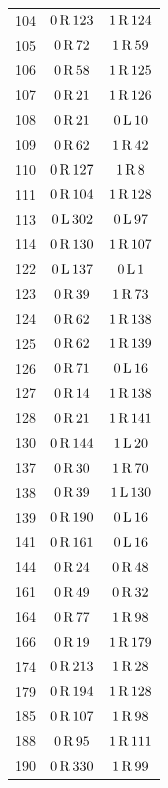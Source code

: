 \begin{longtable}{@{}rcc@{}}
104 & $0\,\mathrm{R}\,123$ & $1\,\mathrm{R}\,124$\\
105 & $0\,\mathrm{R}\,72$ & $1\,\mathrm{R}\,59$\\
106 & $0\,\mathrm{R}\,58$ & $1\,\mathrm{R}\,125$\\
107 & $0\,\mathrm{R}\,21$ & $1\,\mathrm{R}\,126$\\
108 & $0\,\mathrm{R}\,21$ & $0\,\mathrm{L}\,10$\\
109 & $0\,\mathrm{R}\,62$ & $1\,\mathrm{R}\,42$\\
110 & $0\,\mathrm{R}\,127$ & $1\,\mathrm{R}\,8$\\
111 & $0\,\mathrm{R}\,104$ & $1\,\mathrm{R}\,128$\\
113 & $0\,\mathrm{L}\,302$ & $0\,\mathrm{L}\,97$\\
114 & $0\,\mathrm{R}\,130$ & $1\,\mathrm{R}\,107$\\
122 & $0\,\mathrm{L}\,137$ & $0\,\mathrm{L}\,1$\\
123 & $0\,\mathrm{R}\,39$ & $1\,\mathrm{R}\,73$\\
124 & $0\,\mathrm{R}\,62$ & $1\,\mathrm{R}\,138$\\
125 & $0\,\mathrm{R}\,62$ & $1\,\mathrm{R}\,139$\\
126 & $0\,\mathrm{R}\,71$ & $0\,\mathrm{L}\,16$\\
127 & $0\,\mathrm{R}\,14$ & $1\,\mathrm{R}\,138$\\
128 & $0\,\mathrm{R}\,21$ & $1\,\mathrm{R}\,141$\\
130 & $0\,\mathrm{R}\,144$ & $1\,\mathrm{L}\,20$\\
137 & $0\,\mathrm{R}\,30$ & $1\,\mathrm{R}\,70$\\
138 & $0\,\mathrm{R}\,39$ & $1\,\mathrm{L}\,130$\\
139 & $0\,\mathrm{R}\,190$ & $0\,\mathrm{L}\,16$\\
141 & $0\,\mathrm{R}\,161$ & $0\,\mathrm{L}\,16$\\
144 & $0\,\mathrm{R}\,24$ & $0\,\mathrm{R}\,48$\\
161 & $0\,\mathrm{R}\,49$ & $0\,\mathrm{R}\,32$\\
164 & $0\,\mathrm{R}\,77$ & $1\,\mathrm{R}\,98$\\
166 & $0\,\mathrm{R}\,19$ & $1\,\mathrm{R}\,179$\\
174 & $0\,\mathrm{R}\,213$ & $1\,\mathrm{R}\,28$\\
179 & $0\,\mathrm{R}\,194$ & $1\,\mathrm{R}\,128$\\
185 & $0\,\mathrm{R}\,107$ & $1\,\mathrm{R}\,98$\\
188 & $0\,\mathrm{R}\,95$ & $1\,\mathrm{R}\,111$\\
190 & $0\,\mathrm{R}\,330$ & $1\,\mathrm{R}\,99$\\

\end{longtable}
